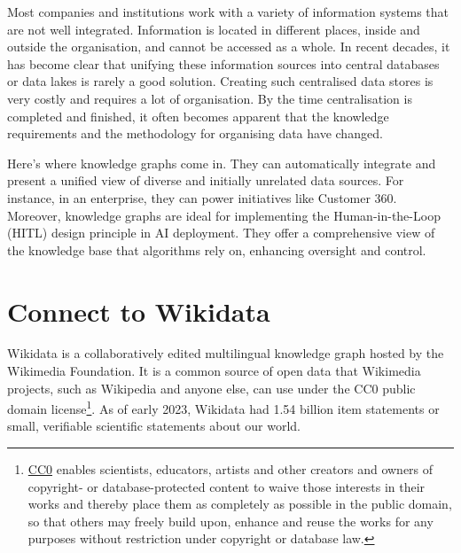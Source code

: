 \documentclass[
  letterpaper,
  DIV=11,
  numbers=noendperiod]{scrreprt}
\begin{document}
Most companies and institutions work with a variety of information
systems that are not well integrated. Information is located in
different places, inside and outside the organisation, and cannot be
accessed as a whole. In recent decades, it has become clear that
unifying these information sources into central databases or data lakes
is rarely a good solution. Creating such centralised data stores is very
costly and requires a lot of organisation. By the time centralisation is
completed and finished, it often becomes apparent that the knowledge
requirements and the methodology for organising data have changed.

Here's where knowledge graphs come in. They can automatically integrate
and present a unified view of diverse and initially unrelated data
sources. For instance, in an enterprise, they can power initiatives like
Customer 360. Moreover, knowledge graphs are ideal for implementing the
Human-in-the-Loop (HITL) design principle in AI deployment. They offer a
comprehensive view of the knowledge base that algorithms rely on,
enhancing oversight and control.

\section{Connect to Wikidata}\label{sec-wikidata}

Wikidata is a collaboratively edited multilingual knowledge graph hosted
by the Wikimedia Foundation. It is a common source of open data that
Wikimedia projects, such as Wikipedia and anyone else, can use under the
CC0 public domain license\footnote{\href{https://creativecommons.org/public-domain/cc0/}{CC0}
  enables scientists, educators, artists and other creators and owners
  of copyright- or database-protected content to waive those interests
  in their works and thereby place them as completely as possible in the
  public domain, so that others may freely build upon, enhance and reuse
  the works for any purposes without restriction under copyright or
  database law.}. As of early 2023, Wikidata had 1.54 billion item
statements or small, verifiable scientific statements about our world.
\end{document}
